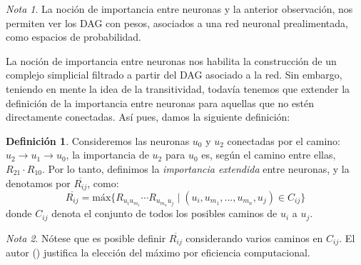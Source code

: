 \documentclass[12pt, a4paper, twoside]{book}
\numberwithin{equation}{section}
\theoremstyle{definition}
\newtheorem{defi}{Definición}[section]
\theoremstyle{remark}
\newtheorem*{remark}{Nota}
\theoremstyle{plain}
\begin{document}
	\begin{remark}
		La noción de importancia entre neuronas y la anterior 
		observación, nos permiten ver los DAG con pesos, asociados a 
		una red neuronal prealimentada, como espacios de probabilidad.
	\end{remark}

	La noción de importancia entre neuronas nos habilita la construcción 
	de un complejo simplicial filtrado a partir del DAG asociado a la red. 
	Sin embargo, teniendo en mente la idea de la transitividad, todavía 
	tenemos que extender la definición de la importancia entre neuronas 
	para aquellas que no estén directamente conectadas. Así pues, damos la 
	siguiente definición: 
	\begin{defi}
		\label{def:impExt}	
	Consideremos las neuronas $u_{0}$ y $u_{2}$ conectadas por el camino: 
	$u_{2} 
	\rightarrow u_{1} \rightarrow u_{0}$, la importancia de $u_{2}$ para 
	$u_{0}$ es, según el camino entre ellas, $R_{21} \cdot R_{10}$.
	Por lo tanto, definimos la \textit{importancia extendida} entre 
	neuronas, y la denotamos por $\overline{R_{ij}}$, como:
	\begin{equation*}
		\overline{R_{ij}}=\text{máx}\{R_{u_{i}u_{m_{1}}} \cdots
		R_{u_{m_{n}}u_{j}} \mid (u_{i},u_{m_{1}},...,u_{m_{n}},u_{j}) 
	\in C_{ij} \}
	\end{equation*}	
	donde $C_{ij}$ denota el conjunto de todos los posibles caminos de 
	$u_{i}$ a $u_{j}$. 
	\end{defi}

	\begin{remark}
	Nótese que es posible definir $\overline{R_{ij}}$ considerando varios 
	caminos en $C_{ij}$. El autor (\cite{Articulo-Watanabe}) justifica la 
	elección del máximo por eficiencia computacional.
	\end{remark}
\end{document}
